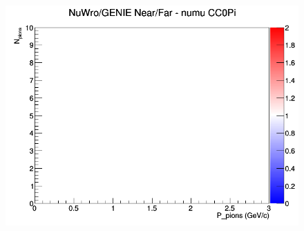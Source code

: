 \documentclass[12pt]{article}
\begin{document}
\begin{figure}[h]
\endminipage
{}
\includegraphics[width=\linewidth]{N_P/nominal/pions/ratios/CC0Pi_NuWro_GENIE_numu_NF_N_P.png}
\endminipage
\newline
\end{figure}
\clearpage
\end{document}
